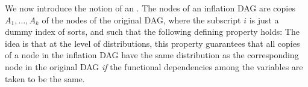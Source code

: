 {%









We now introduce the notion of an . The nodes of an inflation DAG are copies $A_1,\ldots,A_k$ of the nodes of the original DAG, where the subscript $i$ is just a dummy index of sorts, and such that the following defining property holds:  The idea is that at the level of distributions, this property guarantees that all copies of a node in the inflation DAG have the same distribution as the corresponding node in the original DAG \emph{if} the functional dependencies among the variables are taken to be the same.


}
